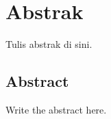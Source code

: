 \chapter*{Abstrak}
Tulis abstrak di sini.

\begin{otherlanguage}{english}
\chapter*{Abstract}
Write the abstract here.
\end{otherlanguage}
